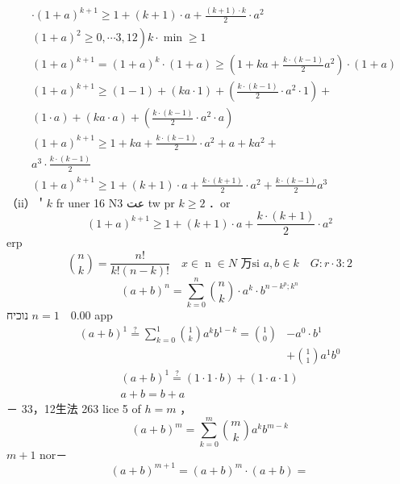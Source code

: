 \documentclass[12pt]{article}
\begin{document}
\[
\begin{aligned}
& \cdot(1+a)^{k+1} \geq 1+(k+1) \cdot a+\frac{(k+1) \cdot k}{2} \cdot a^{2} \\
& \left.(1+a)^{2} \geq 0, \cdots 3,12\right) k \cdot \min \geq 1 \\
& (1+a)^{k+1}=(1+a)^{k} \cdot(1+a) \geq\left(1+k a+\frac{k \cdot(k-1)}{2} a^{2}\right) \cdot(1+a) \\
& (1+a)^{k+1} \geq(1-1)+(k a \cdot 1)+\left(\frac{k \cdot(k-1)}{2} \cdot a^{2} \cdot 1\right)+ \\
& (1 \cdot a)+(k a \cdot a)+\left(\frac{k \cdot(k-1)}{2} \cdot a^{2} \cdot a\right) \\
& (1+a)^{k+1} \geq 1+k a+\frac{k \cdot(k-1)}{2} \cdot a^{2}+a+k a^{2}+ \\
& a^{3} \cdot \frac{k \cdot(k-1)}{2} \\
& (1+a)^{k+1} \geq 1+(k+1) \cdot a+\frac{k \cdot(k+1)}{2} \cdot a^{2}+\frac{k \cdot(k-1)}{2} a^{3}
\end{aligned}
\]
（ii）＇\(k\) fr uner 16 Nعت 3 tw pr \(k \geq 2\) ．or
\[
(1+a)^{k+1} \geqslant 1+(k+1) \cdot a+\frac{k \cdot(k+1)}{2} \cdot a^{2}
\]
erp
\[
\binom{n}{k}=\frac{n!}{k!(n-k)!} \quad x \in \operatorname{n} \in N \text { 万si } a, b \in k \quad G: r \cdot 3: 2
\]
\[
(a+b)^{n}=\sum_{k=0}^{n}\binom{n}{k} \cdot a^{k} \cdot b^{n-k^{p} ; k^{n}}
\]
נוכיח
\(n=1 \quad 0.00\) app
\[
\begin{aligned}
(a+b)^{1} \stackrel{?}{=} \sum_{k=0}^{1}\binom{1}{k} a^{k} b^{1-k}=\binom{1}{0} & -a^{0} \cdot b^{1} \\
& +\binom{1}{1} a^{1} b^{0}
\end{aligned}
\]
\[
\begin{gathered}
(a+b)^{1} \stackrel{?}{=}(1 \cdot 1 \cdot b)+(1 \cdot a \cdot 1) \\
a+b=b+a
\end{gathered}
\]
－
33，12生法 263
lice 5 of \(h=m\) ，
\[
(a+b)^{m}=\sum_{k=0}^{m}\binom{m}{k} a^{k} b^{m-k}
\]
\(m+1\) nor－
\[
(a+b)^{m+1}=(a+b)^{m} \cdot(a+b)=
\]
\end{document}
